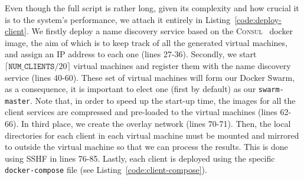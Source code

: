 Even though the full script is rather long, given its complexity and how crucial it is to the system's performance, we attach it entirely in Listing~\ref{code:deploy-client}.
We firstly deploy a name discovery service based on the \textsc{Consul}~\cite{consul-image} docker image, the aim of which is to keep track of all the generated virtual machines, and assign an IP address to each one (lines 27-36).
Secondly, we start $\lceil \texttt{NUM\_CLIENTS} / 20 \rceil$ virtual machines and register them with the name discovery service (lines 40-60).
These set of virtual machines will form our Docker Swarm, as a consequence, it is important to elect one (first by default) as our \texttt{swarm-master}.
Note that, in order to speed up the start-up time, the images for all the client services are compressed and pre-loaded to the virtual machines (lines 62-66).
In third place, we create the overlay network (lines 70-71).
Then, the local directories for each client in each virtual machine must be mounted and mirrored to outside the virtual machine so that we can process the results.
This is done using SSHF in lines 76-85.
Lastly, each client is deployed using the specific \texttt{docker-compose} file (see Listing~\ref{code:client-compose}).
